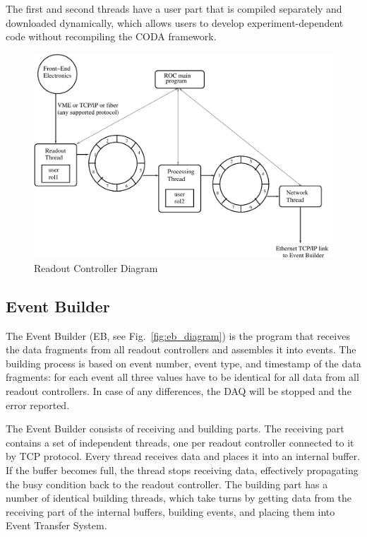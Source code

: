 The first and second threads have a user part that is compiled separately and downloaded dynamically, which allows users to develop experiment-dependent code without recompiling the CODA framework.

\begin{figure}[hbt]
	\centering
	\includegraphics[width=1.0\columnwidth,keepaspectratio]{img/roc_diagram.pdf}
	\caption{Readout Controller Diagram}
	\label{fig:roc_diagram}
\end{figure}


\subsection{Event Builder}

The Event Builder (EB, see Fig.~\ref{fig:eb_diagram}) is the program that receives the data fragments from all readout controllers and assembles it into events. The building process is based on event number, event type, and timestamp of the data fragments: for each event all three values have to be identical for all data from all readout controllers. In case of any differences, the DAQ will be stopped and the error reported.

The Event Builder consists of receiving and building parts. The receiving part contains a set of independent threads, one per readout controller connected to it by TCP protocol. Every thread receives data and places it into an internal buffer. If the buffer becomes full, the thread stops receiving data, effectively propagating the busy condition back to the readout controller. The building part has a number of identical building threads, which take turns by getting data from the receiving part of the internal buffers, building events, and placing them into Event Transfer System.

